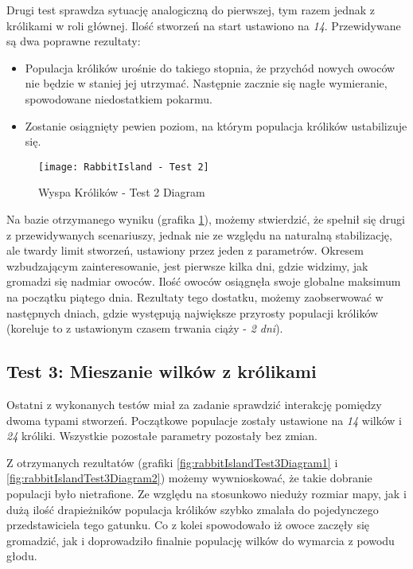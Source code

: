 \par Drugi test sprawdza sytuację analogiczną do pierwszej, tym razem jednak z królikami w roli głównej. Ilość stworzeń na start ustawiono na \emph{14}. Przewidywane są dwa poprawne rezultaty:
\begin{itemize}
	\item Populacja królików urośnie do takiego stopnia, że przychód nowych owoców nie będzie w staniej jej utrzymać. Następnie zacznie się nagłe wymieranie, spowodowane niedostatkiem pokarmu.
	\item Zostanie osiągnięty pewien poziom, na którym populacja królików ustabilizuje się.
\end{itemize}

\begin{figure}
	\texttt{[image: RabbitIsland - Test 2]}
	\caption{Wyspa Królików - Test 2 Diagram}
	\label{fig:rabbitIslandTest2Diagram1}
\end{figure}

\par Na bazie otrzymanego wyniku (grafika \ref{fig:rabbitIslandTest2Diagram1}), możemy stwierdzić, że spełnił się drugi z przewidywanych scenariuszy, jednak nie ze względu na naturalną stabilizację, ale twardy limit stworzeń, ustawiony przez jeden z parametrów. Okresem wzbudzającym zainteresowanie, jest pierwsze kilka dni, gdzie widzimy, jak gromadzi się nadmiar owoców. Ilość owoców osiągnęła swoje globalne maksimum na początku piątego dnia. Rezultaty tego dostatku, możemy zaobserwować w następnych dniach, gdzie występują największe przyrosty populacji królików (koreluje to z ustawionym czasem trwania ciąży - \emph{2 dni}).

\subsection{Test 3: Mieszanie wilków z królikami}

\par Ostatni z wykonanych testów miał za zadanie sprawdzić interakcję pomiędzy dwoma typami stworzeń. Początkowe populacje zostały ustawione na \emph{14} wilków i \emph{24} króliki. Wszystkie pozostałe parametry pozostały bez zmian.

\par Z otrzymanych rezultatów (grafiki \ref{fig:rabbitIslandTest3Diagram1} i \ref{fig:rabbitIslandTest3Diagram2}) możemy wywnioskować, że takie dobranie populacji było nietrafione. Ze względu na stosunkowo nieduży rozmiar mapy, jak i dużą ilość drapieżników populacja królików szybko zmalała do pojedynczego przedstawiciela tego gatunku. Co z kolei spowodowało iż owoce zaczęły się gromadzić, jak i doprowadziło finalnie populację wilków do wymarcia z powodu głodu.

